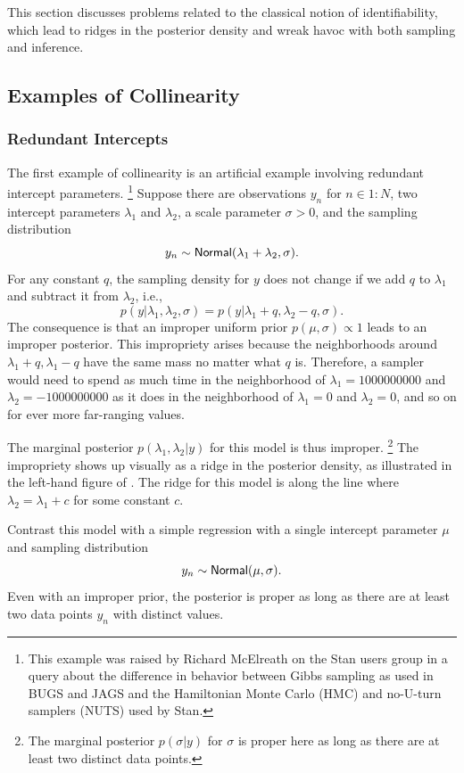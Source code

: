 This section discusses problems related to the classical notion of
identifiability, which lead to ridges in the posterior density and
wreak havoc with both sampling and inference.

\subsection{Examples of Collinearity}

\subsubsection{Redundant Intercepts}

The first example of collinearity is an artificial example involving
redundant intercept parameters.%
%
\footnote{This example was raised by Richard McElreath on the Stan
  users group in a query about the difference in behavior between
  Gibbs sampling as used in BUGS and JAGS and the Hamiltonian Monte
  Carlo (HMC) and no-U-turn samplers (NUTS) used by Stan.}
%
Suppose there are observations $y_n$ for $n \in 1{:}N$, 
two intercept parameters $\lambda_1$ and
$\lambda_2$, a scale parameter $\sigma > 0$, and the sampling distribution
%
\[
y_n \sim \distro{Normal}(\lambda_1 + \lambda_2, \sigma).
\]
%
For any constant $q$, the sampling density for $y$ does not change if
we add $q$ to $\lambda_1$ and subtract it from $\lambda_2$, i.e.,
%
\[
p(y | \lambda_1, \lambda_2,\sigma)
=
p(y | \lambda_1 + q, \lambda_2 - q, \sigma).
\]
%
The consequence is that an improper uniform prior $p(\mu,\sigma)
\propto 1$ leads to an improper posterior.  This impropriety arises
because the neighborhoods around $\lambda_1 + q, \lambda_1 - q$ have
the same mass no matter what $q$ is.  Therefore, a sampler would need
to spend as much time in the neighborhood of $\lambda_1=1000000000$
and $\lambda_2=-1000000000$ as it does in the neighborhood of
$\lambda_1=0$ and $\lambda_2=0$, and so on for ever more far-ranging
values.

The marginal posterior $p(\lambda_1,\lambda_2|y)$ for this model is
thus improper.%
%
\footnote{The marginal posterior $p(\sigma|y)$ for $\sigma$ is proper
  here as long as there are at least two distinct data points.}
%
The impropriety shows up visually as a ridge in the posterior density,
as illustrated in the left-hand figure of
.  The ridge for this model is
along the line where $\lambda_2 = \lambda_1 + c$ for some constant
$c$.  

Contrast this model with a simple regression with a single intercept
parameter $\mu$ and sampling distribution
\[
y_n \sim \distro{Normal}(\mu,\sigma).
\]
Even with an improper prior, the posterior is proper as long as there
are at least two data points $y_n$ with distinct values.



